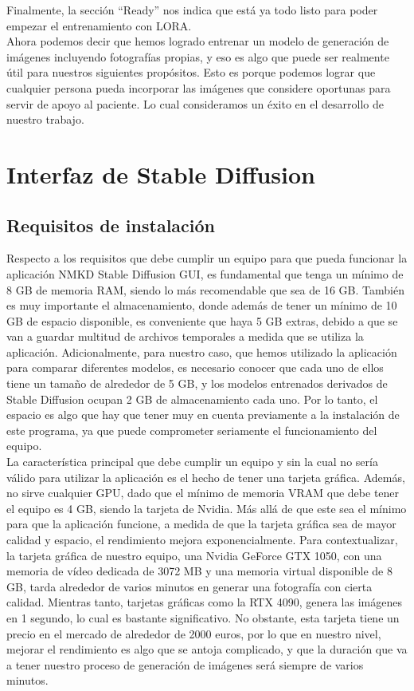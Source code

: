 Finalmente, la sección ``Ready'' nos indica que está ya todo listo para poder empezar el entrenamiento con LORA. \\

Ahora podemos decir que hemos logrado entrenar un modelo de generación de imágenes incluyendo fotografías propias, y eso es algo que puede ser realmente útil para nuestros siguientes propósitos. Esto es porque podemos lograr que cualquier persona pueda incorporar las imágenes que considere oportunas para servir de apoyo al paciente. Lo cual consideramos un éxito en el desarrollo de nuestro trabajo. 


\section{Interfaz de Stable Diffusion}

\subsection{Requisitos de instalación}

Respecto a los requisitos que debe cumplir un equipo para que pueda funcionar la aplicación NMKD Stable Diffusion GUI, es fundamental que tenga un mínimo de 8 GB de memoria RAM, siendo lo más recomendable que sea de 16 GB. También es muy importante el almacenamiento, donde además de tener un mínimo de 10 GB de espacio disponible, es conveniente que haya 5 GB extras, debido a que se van a guardar multitud de archivos temporales a medida que se utiliza la aplicación. Adicionalmente, para nuestro caso, que hemos utilizado la aplicación para comparar diferentes modelos, es necesario conocer que cada uno de ellos tiene un tamaño de alrededor de 5 GB, y los modelos entrenados derivados de Stable Diffusion ocupan 2 GB de almacenamiento cada uno. Por lo tanto, el espacio es algo que hay que tener muy en cuenta previamente a la instalación de este programa, ya que puede comprometer seriamente el funcionamiento del equipo. \\

La característica principal que debe cumplir un equipo y sin la cual no sería válido para utilizar la aplicación es el hecho de tener una tarjeta gráfica. Además, no sirve cualquier GPU, dado que el mínimo de memoria VRAM que debe tener el equipo es 4 GB, siendo la tarjeta de Nvidia. Más allá de que este sea el mínimo para que la aplicación funcione, a medida de que la tarjeta gráfica sea de mayor calidad y espacio, el rendimiento mejora exponencialmente. Para contextualizar, la tarjeta gráfica de nuestro equipo, una Nvidia GeForce GTX 1050, con una memoria de vídeo dedicada de 3072 MB y una memoria virtual disponible de 8 GB, tarda alrededor de varios minutos en generar una fotografía con cierta calidad. Mientras tanto, tarjetas gráficas como la RTX 4090, genera las imágenes en 1 segundo, lo cual es bastante significativo. No obstante, esta tarjeta tiene un precio en el mercado de alrededor de 2000 euros, por lo que en nuestro nivel, mejorar el rendimiento es algo que se antoja complicado, y que la duración que va a tener nuestro proceso de generación de imágenes será siempre de varios minutos.\\


